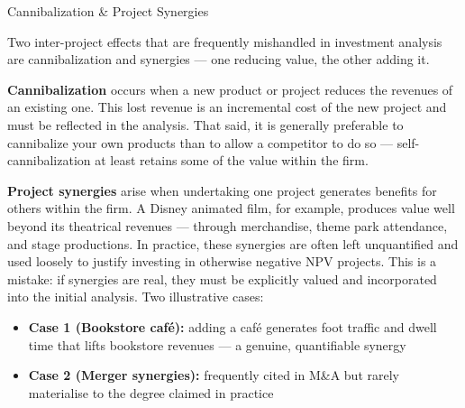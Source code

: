 \documentclass[10pt]{article}
\begin{document}
    \begin{core}{Cannibalization \& Project Synergies}

      Two inter-project effects that are frequently mishandled in investment analysis are cannibalization and synergies — one reducing value, the other adding it.

      \textbf{Cannibalization} occurs when a new product or project reduces the revenues of an existing one. This lost revenue is an incremental cost of the new project and must be reflected in the analysis. That said, it is generally preferable to cannibalize your own products than to allow a competitor to do so — self-cannibalization at least retains some of the value within the firm.

      \textbf{Project synergies} arise when undertaking one project generates benefits for others within the firm. A Disney animated film, for example, produces value well beyond its theatrical revenues — through merchandise, theme park attendance, and stage productions. In practice, these synergies are often left unquantified and used loosely to justify investing in otherwise negative NPV projects. This is a mistake: if synergies are real, they must be explicitly valued and incorporated into the initial analysis. Two illustrative cases:

      \begin{itemize}

        \item \textbf{Case 1 (Bookstore café):} adding a café generates foot traffic and dwell time that lifts bookstore revenues — a genuine, quantifiable synergy

        \item \textbf{Case 2 (Merger synergies):} frequently cited in M\&A but rarely materialise to the degree claimed in practice

      \end{itemize}


    \end{core}
\end{document}
